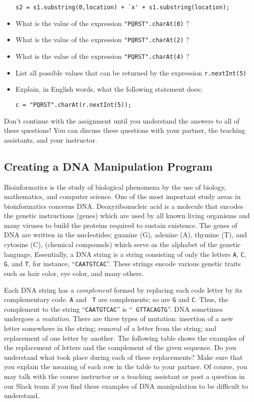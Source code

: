 \begin{itemize}
\begin{center}
\verb$s2 = s1.substring(0,location) + `x' + s1.substring(location);$
\end{center}
\item
What is the value of the expression \verb$"PQRST".charAt(0)$ ?
\item
What is the value of the expression \verb$"PQRST".charAt(2)$ ?
\item
What is the value of the expression \verb$"PQRST".charAt(4)$ ?
\item
List all possible values that can be returned by the expression
\verb$r.nextInt(5)$
\item
Explain, in English words, what the following statement does:
\begin{center}
\verb$c = "PQRST".charAt(r.nextInt(5));$
\end{center}
\end{itemize}

\noindent Don't continue with the assignment until you understand the answers to all of these questions!  You can discuss
these questions with your partner, the teaching assistants, and your instructor.

\vspace{-0.05in}
\subsection*{Creating a DNA Manipulation Program}
\vspace{-0.05in}

Bioinformatics is the study of biological phenomena by the use of biology, mathematics, and computer science. One of the
most important study areas in bioinformatics concerns DNA. Deoxyribonucleic acid is a molecule that encodes the
genetic instructions (genes) which are used by all known living organisms and many viruses to build the proteins
required to sustain existence. The genes of DNA are written in the nucleotides; guanine (G), adenine (A), thymine (T),
and cytosine (C), (chemical compounds) which serve as the alphabet of the genetic language.  Essentially, a DNA string
is a string consisting of only the letters {\tt A}, {\tt C}, {\tt G}, and {\tt T}, for instance, ``{\tt CAATGTCAC}''.
These strings encode various genetic traits such as hair color, eye color, and many others.

Each DNA string has a {\em complement} formed by replacing each code letter by its complementary code. {\tt A} and {\tt
T} are complements; so are {\tt G} and {\tt C}. Thus, the complement to the string ``{\tt CAATGTCAC}'' is ``{\tt
GTTACAGTG}''.  DNA sometimes undergoes a {\em mutation}. There are three types of mutation: insertion of a new letter
somewhere in the string; removal of a letter from the string; and replacement of one letter by another. The following
table shows the examples of the replacement of letters and the complement of the given sequence. Do you understand what
took place during each of these replacements? Make sure that you explain the meaning of each row in the table to your
partner. Of course, you may talk with the course instructor or a teaching assistant or post a question in our Slack team
if you find these examples of DNA manipulation to be difficult to understand.

